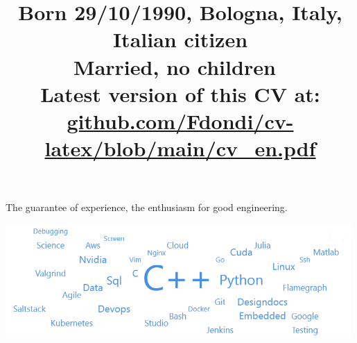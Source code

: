 \documentclass[11pt,a4paper,sans]{moderncv} %
\title{\small \faIcon{birthday-cake} Born 29/10/1990, Bologna, Italy, \faPassport\  Italian citizen\hfill\ \\
\faGlassCheers Married, no children\hfill\ \\[+0.5em] {\color{black} Latest version of this CV at: \href{https://github.com/Fdondi/cv-latex/blob/main/cv_en.pdf}{github.com/Fdondi/cv-latex/blob/main/cv\_en.pdf}}}
\let\oldmakecvtitle\makecvtitle
\renewcommand*{\makecvtitle}{%
  \hfil%
  \oldmakecvtitle%
}
\begin{document}
\makecvtitle %
\vspace{-12mm}
\begin{minipage}{0.6\linewidth}
The guarantee of experience, the enthusiasm for good engineering. 
\end{minipage}
\begin{minipage}{0.44\linewidth}
\centering
\includegraphics[width=0.99\textwidth]{cloud_long.png}
\end{minipage}
\noindent
\end{document}
